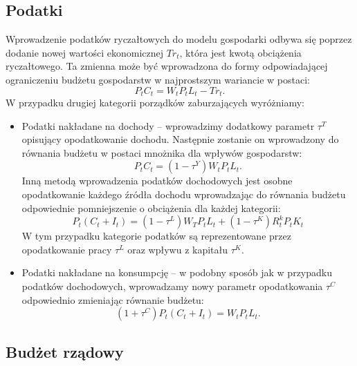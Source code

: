 \subsection{Podatki}

Wprowadzenie podatków ryczałtowych do modelu gospodarki odbywa się poprzez dodanie nowej wartości ekonomicznej $Tr_t$, która jest kwotą obciążenia ryczałtowego. Ta zmienna może być wprowadzona do formy odpowiadającej ograniczeniu budżetu gospodarstw w najprostszym wariancie w postaci:
\begin{equation}
    P_t C_t = W_t P_t L_t - Tr_t.
\end{equation}
W przypadku drugiej kategorii porządków zaburzających wyróżniamy:
\begin{itemize}
    \item Podatki nakładane na dochody -- wprowadzimy dodatkowy parametr $\tau^T$ opisujący opodatkowanie dochodu. Następnie zostanie on wprowadzony do równania budżetu w postaci mnożnika dla wpływów gospodarstw:
    \begin{equation}
        P_t C_t = (1-\tau^Y)W_t P_t L_t.
    \end{equation}
    Inną metodą wprowadzenia podatków dochodowych jest osobne opodatkowanie każdego źródła dochodu wprowadzając do równania budżetu odpowiednie pomniejszenie o obciążenia dla każdej kategorii:
    \begin{equation}
        P_t\left(C_t + I_t\right) = (1-\tau^L)W_T P_t L_t + (1 - \tau^K)R^k_t P_t K_t 
    \end{equation}
    W tym przypadku kategorie podatków są reprezentowane przez opodatkowanie pracy $\tau^L$ oraz wpływu z kapitału $\tau^K$.
    \item Podatki nakładane na konsumpcję -- w podobny sposób jak w przypadku podatków dochodowych, wprowadzamy nowy parametr opodatkowania $\tau^C$ odpowiednio zmieniając równanie budżetu:
    \begin{equation}
        (1+\tau^C)P_t\left(C_t + I_t\right) = W_t P_t L_t.
    \end{equation}
\end{itemize}

\subsection{Budżet rządowy}

